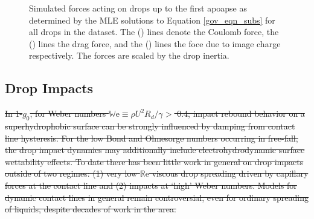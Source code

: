 \documentclass[aip,reprint, floatfix]{revtex4-1}
\begin{document}
\begin{figure}[!htb]
    \centering
    \resizebox{0.5\textwidth}{!}{}
    \caption{Simulated forces acting on drops up to the first apoapse as determined by the MLE solutions to Equation \ref{gov_eqn_subs} for all drops in the dataset. The (\protect\redline) lines denote the Coulomb force, the (\protect\blueline) lines the drag force, and the (\protect\cyanline) lines the foce due to image charge respectively. The forces are scaled by the drop inertia.\label{fig:forces}}
\end{figure}

\subsection{Drop Impacts}
\sout{In 1-$g_0$, for Weber numbers $\mathbb{W}\mbox{e} \equiv \rho U^2 R_d/\gamma >$ 0.4, impact rebound behavior on a superhydrophobic surface can be strongly influenced by damping from contact line hysteresis. For the low Bond and Ohnesorge numbers occurring in free-fall, the drop impact dynamics may additionally include electrohydrodynamic surface wettability effects. To date there has been little work in general on drop impacts outside of two regimes: (1) very low $\mathbb{R}\mbox{e}$ viscous drop spreading driven by capillary forces at the contact line and (2) impacts at `high' Weber numbers. Models for dynamic contact lines in general remain controversial, even for ordinary spreading of liquids, despite decades of work in the area.} 
\end{document}
